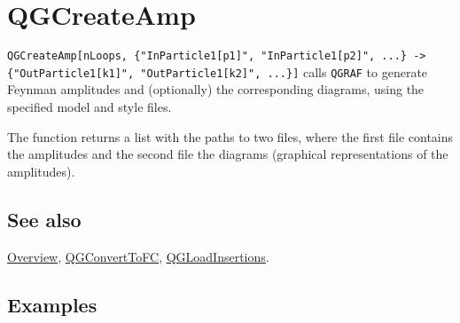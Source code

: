 \documentclass[../FeynHelpersManual.tex]{subfiles}
\begin{document}
\hypertarget{qgcreateamp}{
\section{QGCreateAmp}\label{qgcreateamp}}

\texttt{QGCreateAmp[\allowbreak{}nLoops,\ \allowbreak{}\{\allowbreak{}"InParticle1[\allowbreak{}p1]",\ \allowbreak{}"InParticle1[\allowbreak{}p2]",\ \allowbreak{}...\} -> \{\allowbreak{}"OutParticle1[\allowbreak{}k1]",\ \allowbreak{}"OutParticle1[\allowbreak{}k2]",\ \allowbreak{}...\}]}
calls \texttt{QGRAF} to generate Feynman amplitudes and (optionally) the
corresponding diagrams, using the specified model and style files.

The function returns a list with the paths to two files, where the first
file contains the amplitudes and the second file the diagrams (graphical
representations of the amplitudes).

\subsection{See also}

\hyperlink{toc}{Overview}, \hyperlink{qgconverttofc}{QGConvertToFC},
\hyperlink{qgloadinsertions}{QGLoadInsertions}.

\subsection{Examples}
\end{document}
